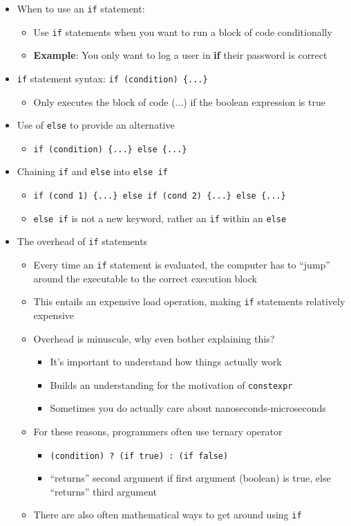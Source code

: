 \documentclass{article}
\begin{document}
\begin{itemize}
	\item When to use an \texttt{if} statement:
	\begin{itemize}
		\item Use \texttt{if} statements when you want to run a block of code conditionally
		\item \textbf{Example}: You only want to log a user in \textbf{if} their password is correct
	\end{itemize}
	\item \texttt{if} statement syntax: \texttt{if (condition) \{...\}}
	\begin{itemize}
		\item Only executes the block of code (...) if the boolean expression is true
	\end{itemize}
	\item Use of \texttt{else} to provide an alternative
	\begin{itemize}
		\item \texttt{if (condition) \{...\} else \{...\}}
	\end{itemize}
	\item Chaining \texttt{if} and \texttt{else} into \texttt{else if}
	\begin{itemize}
		\item \texttt{if (cond 1) \{...\} else if (cond 2) \{...\} else \{...\}}
		\item \texttt{else if} is not a new keyword, rather an \texttt{if} within an \texttt{else}
	\end{itemize}
	\item The overhead of \texttt{if} statements
	\begin{itemize}
		\item Every time an \texttt{if} statement is evaluated, the computer has to ``jump'' around the executable to the correct execution block
		\item This entails an expensive load operation, making \texttt{if} statements relatively expensive
		\item Overhead is minuscule, why even bother explaining this?
		\begin{itemize}
			\item It's important to understand how things actually work
			\item Builds an understanding for the motivation of \texttt{constexpr}
			\item Sometimes you do actually care about nanoseconds-microseconds
		\end{itemize} 
		\item For these reasons, programmers often use ternary operator
		\begin{itemize}
			\item \texttt{(condition) ? (if true) : (if false)}
			\item ``returns'' second argument if first argument (boolean) is true, else ``returns'' third argument
		\end{itemize}
		\item There are also often mathematical ways to get around using \texttt{if}
	\end{itemize}
\end{itemize}
\end{document}
